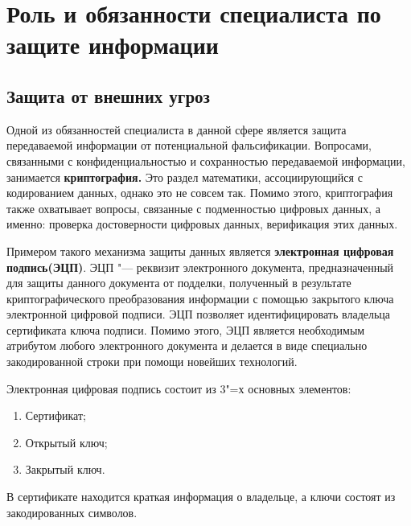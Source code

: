 \section{Роль и обязанности специалиста по защите информации}
\subsection{Защита от внешних угроз}
    Одной из обязанностей специалиста в данной сфере является защита передаваемой информации от потенциальной фальсификации. Вопросами, связанными с конфиденциальностью и 
    сохранностью передаваемой информации, занимается
    \textbf{криптография.} Это раздел математики, ассоциирующийся с кодированием данных, однако это не совсем так.
    Помимо этого, криптография также охватывает вопросы, связанные с подменностью цифровых данных, а именно: проверка достоверности
    цифровых данных, верификация этих данных.

    Примером такого механизма защиты данных является \textbf{электронная цифровая подпись(ЭЦП)}. ЭЦП "--- реквизит электронного документа, предназначенный для 
    защиты данного документа от подделки, полученный в результате криптографического преобразования
    информации с помощью закрытого ключа электронной цифровой подписи. ЭЦП позволяет идентифицировать владельца сертификата
    ключа подписи. Помимо этого, ЭЦП является необходимым атрибутом любого электронного документа и делается в виде специально
    закодированной строки при помощи новейших технологий.  

    Электронная цифровая подпись состоит из 3"=х основных элементов:

    \begin{enumerate}
        \item Сертификат;
        \item Открытый ключ;
        \item Закрытый ключ.
    \end{enumerate}

    В сертификате находится краткая информация о владельце, а ключи состоят из закодированных символов. 


